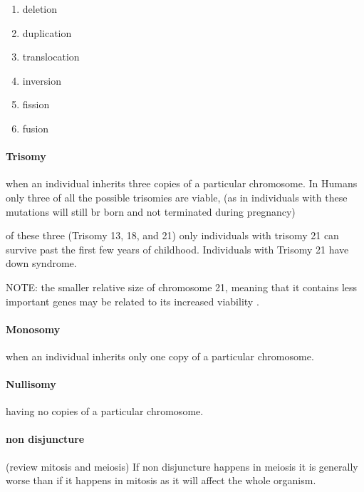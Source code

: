 \documentclass[]{article}
\providecommand{\tightlist}{%
  \setlength{\itemsep}{0pt}\setlength{\parskip}{0pt}}
\let\oldparagraph\paragraph
\renewcommand{\paragraph}[1]{\oldparagraph{#1}\mbox{}}
\begin{document}
\begin{enumerate}
\def\labelenumi{\arabic{enumi}.}
\tightlist
\item
  deletion
\item
  duplication
\item
  translocation
\item
  inversion
\item
  fission
\item
  fusion
\end{enumerate}

\hypertarget{trisomy}{%
\paragraph{Trisomy}\label{trisomy}}

when an individual inherits three copies of a particular chromosome. In
Humans only three of all the possible trisomies are viable, (as in
individuals with these mutations will still br born and not terminated
during pregnancy)

of these three (Trisomy 13, 18, and 21) only individuals with trisomy 21
can survive past the first few years of childhood. Individuals with
Trisomy 21 have down syndrome.

NOTE: the smaller relative size of chromosome 21, meaning that it
contains less important genes may be related to its increased viability
.

\hypertarget{monosomy}{%
\paragraph{Monosomy}\label{monosomy}}

when an individual inherits only one copy of a particular chromosome.

\hypertarget{nullisomy}{%
\paragraph{Nullisomy}\label{nullisomy}}

having no copies of a particular chromosome.

\hypertarget{non-disjuncture}{%
\paragraph{non disjuncture}\label{non-disjuncture}}

(review mitosis and meiosis) If non disjuncture happens in meiosis it is
generally worse than if it happens in mitosis as it will affect the
whole organism.
\end{document}
